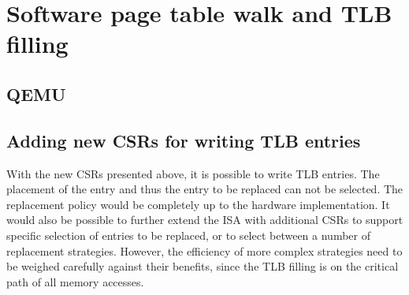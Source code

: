 


\section{Software page table walk and TLB filling}


\subsection{QEMU}





\subsection{Adding new CSRs for writing TLB entries}

With the new CSRs presented above, it is possible to write TLB entries.
The placement of the entry and thus the entry to be replaced can not be selected.
The replacement policy would be completely up to the hardware implementation.
It would also be possible to further extend the ISA with additional CSRs to
support specific selection of entries to be replaced, or to select between
a number of replacement strategies.
However, the efficiency of more complex strategies need to be weighed carefully
against their benefits, since the TLB filling is on the critical path of all
memory accesses.


